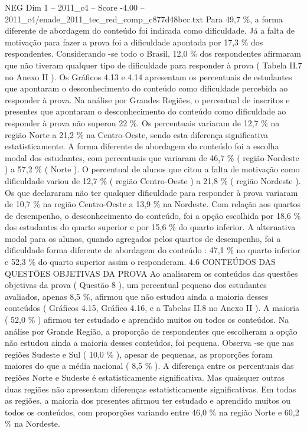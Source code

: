 \begin{textsample}{NEG Dim 1 – 2011\_c4 – Score -4.00 – 2011\_c4/enade\_2011\_tec\_red\_comp\_c877d48bcc.txt}
Para 49,7 \%, a forma diferente de abordagem do conteúdo foi indicada como dificuldade.
Já a falta de motivação para fazer a prova foi a dificuldade apontada por 17,3 \% dos respondentes.
Considerando -se todo o Brasil, 12,0 \% dos respondentes afirmaram que não tiveram qualquer tipo de dificuldade para responder à prova ( Tabela II.7 no Anexo II ).
Os Gráficos 4.13 e 4.14 apresentam os percentuais de estudantes que apontaram o desconhecimento do conteúdo como dificuldade percebida ao responder à prova.
Na análise por Grandes Regiões, o percentual de inscritos e presentes que apontaram o desconhecimento do conteúdo como dificuldade ao responder à prova não superou 22 \%.
Os percentuais variaram de 12,7 \% na região Norte a 21,2 \% na Centro-Oeste, sendo esta diferença significativa estatisticamente.
A forma diferente de abordagem do conteúdo foi a escolha modal dos estudantes, com percentuais que variaram de 46,7 \% ( região Nordeste ) a 57,2 \% ( Norte ).
O percentual de alunos que citou a falta de motivação como dificuldade variou de 12,7 \% ( região Centro-Oeste ) a 21,8 \% ( região Nordeste ).
Os que declararam não ter qualquer dificuldade para responder à prova variaram de 10,7 \% na região Centro-Oeste a 13,9 \% na Nordeste.
Com relação aos quartos de desempenho, o desconhecimento do conteúdo, foi a opção escolhida por 18,6 \% dos estudantes do quarto superior e por 15,6 \% do quarto inferior.
A alternativa modal para os alunos, quando agregados pelos quartos de desempenho, foi a dificuldade forma diferente de abordagem do conteúdo : 47,1 \% no quarto inferior e 52,3 \% do quarto superior assim o responderam. 4.6 CONTEÚDOS DAS QUESTÕES OBJETIVAS DA PROVA Ao analisarem os conteúdos das questões objetivas da prova ( Questão 8 ), um percentual pequeno dos estudantes avaliados, apenas 8,5 \%, afirmou que não estudou ainda a maioria desses conteúdos ( Gráficos 4.15, Gráfico 4.16, e a Tabelas II.8 no Anexo II ).
A maioria ( 52,0 \% ) afirmou ter estudado e aprendido muitos ou todos os conteúdos.
Na análise por Grande Região, a proporção de respondentes que escolheram a opção não estudou ainda a maioria desses conteúdos, foi pequena.
Observa -se que nas regiões Sudeste e Sul ( 10,0 \% ), apesar de pequenas, as proporções foram maiores do que a média nacional ( 8,5 \% ).
A diferença entre os percentuais das regiões Norte e Sudeste é estatisticamente significativa.
Mas quaisquer outras duas regiões não apresentam diferenças estatisticamente significativas.
Em todas as regiões, a maioria dos presentes afirmou ter estudado e aprendido muitos ou todos os conteúdos, com proporções variando entre 46,0 \% na região Norte e 60,2 \% na Nordeste.

\end{textsample}
